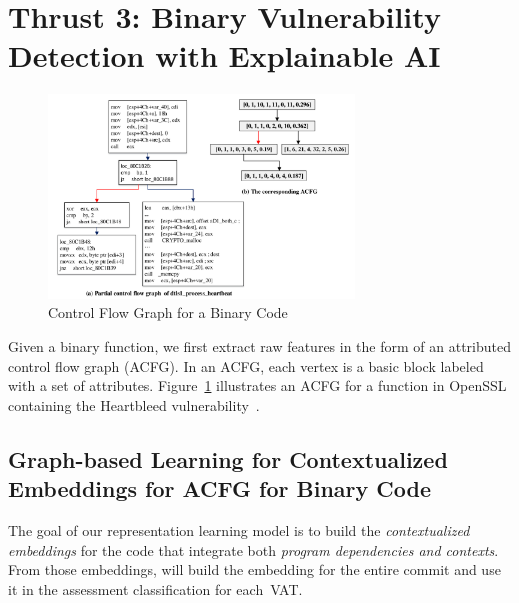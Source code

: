 \section{Thrust 3: Binary Vulnerability Detection with Explainable AI}
\label{sec:thrust3}

\begin{figure}
    \centering
    \includegraphics[width=3.2in]{binary.png}
    \vspace{-10pt}
    \caption{Control Flow Graph for a Binary Code~\cite{gimini17}}
    \label{fig:binary}
\end{figure}

Given a binary function, we first extract raw features in the form of
an attributed control flow graph (ACFG). In an ACFG, each vertex is a
basic block labeled with a set of attributes. Figure~\ref{fig:binary}
illustrates an ACFG for a function in OpenSSL containing the
Heartbleed vulnerability~\cite{gimini17}.




\subsection{Graph-based Learning for Contextualized Embeddings for ACFG for Binary Code}
\label{embedding:sec}

The goal of our representation learning model is to
build the {\em contextualized embeddings} for the code that
integrate both {\em program dependencies and contexts}.
From those embeddings, {\tool} will build the embedding for the entire
commit and use it in the assessment classification for each~VAT.


